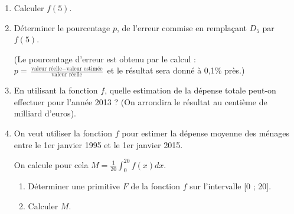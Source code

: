 \begin{enumerate}
     \item
     Calculer $f\left(5\right)$.
     \item
     Déterminer le pourcentage $p$, de l'erreur commise en remplaçant $D_{5}$ par $f\left(5\right)$.
     \par
     (Le pourcentage d'erreur est obtenu par le calcul : 
\\$p=$\nosp$\frac{\text{valeur réelle} - \text{valeur estimée}}{\text{valeur réelle}}$	et le résultat
     sera donné à 0,1\% près.)
     \item
     En utilisant la fonction $f$, quelle estimation de la dépense totale peut-on effectuer pour l'année 2013 ? (On arrondira le résultat au centième de milliard d'euros).
     \item
     On veut utiliser la fonction $f$ pour estimer la dépense moyenne des ménages entre le 1er janvier 1995 et le 1er janvier 2015.
     \par
     On calcule pour cela $M=\frac{1}{20} \int_{0}^{20} f\left(x\right)dx$.
     \begin{enumerate}[label=\alph*.]
          \item
          Déterminer une primitive $F$ de la fonction $f$ sur l'intervalle [0 ; 20].
          \item
     Calculer $M$.\end{enumerate}
\end{enumerate}
